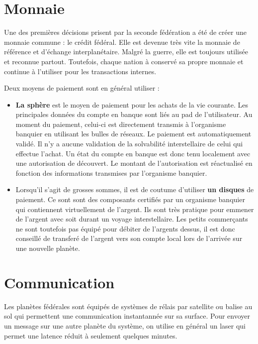 \begin{multicols}{2}

\section{Monnaie}

Une des premières décisions prisent par la seconde fédération a été de créer une monnaie commune : le crédit fédéral. Elle est devenue très vite la monnaie de référence et d'échange interplanétaire. Malgré la guerre, elle est toujours utilisée et reconnue partout. Toutefois, chaque nation à conservé sa propre monnaie et continue à l'utiliser pour les transactions internes. 

Deux moyens de paiement sont en général utiliser :
\begin{itemize}
\item \textbf{La sphère} est le moyen de paiement pour les achats de la vie courante. Les principales données du compte en banque sont liés au pad de l'utilisateur. Au moment du paiement, celui-ci est directement transmis à l'organisme banquier en utilisant les bulles de réseaux. Le paiement est automatiquement validé. Il n'y a aucune validation de la solvabilité interstellaire de celui qui effectue l'achat. Un état du compte en banque est donc tenu localement avec une autorisation de découvert. Le montant de l'autorisation est réactualisé en fonction des informations transmises par l'organisme banquier.
\item Lorsqu'il s'agit de grosses sommes, il est de coutume d'utiliser \textbf{un disques} de paiement. Ce sont sont des composants certifiés par un organisme banquier qui contiennent virtuellement de l'argent. Ils sont très pratique pour emmener de l'argent avec soit durant un voyage interstellaire. Les petits commerçants ne sont toutefois pas équipé pour débiter de l'argents dessus, il est donc conseillé de transferé de l'argent vers son compte local lors de l'arrivée sur une nouvelle planète.

\end{itemize}

\section{Communication}

Les planètes fédérales sont équipés de systèmes de rélais par satellite ou balise au sol qui permettent une communication instantannée sur sa surface. Pour envoyer un message sur une autre planète du système, on utilise en général un laser qui permet une latence réduit à seulement quelques minutes. 


\end{multicols}
